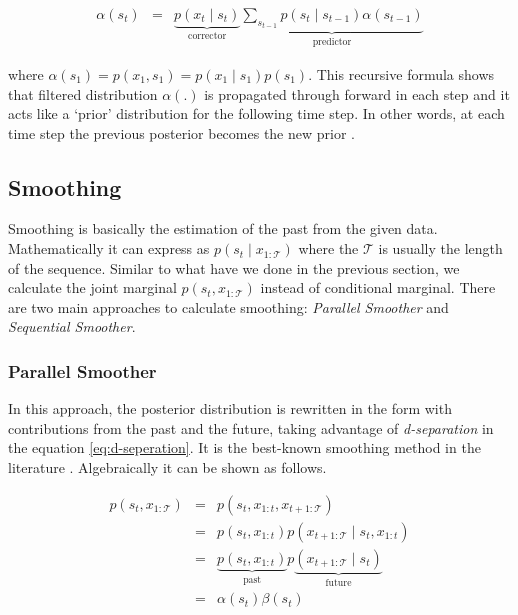 \begin{eqnarray}
    \alpha\left(s_{t}\right) & = & \underbrace{p\left(x_{t} \mid s_{t}\right)}_{\text { corrector }} \underbrace{\sum_{s_{t-1}} p\left(s_{t} \mid s_{t-1}\right) \alpha\left(s_{t-1}\right)}_{\text { predictor }} \label{eq:filtering2}
\end{eqnarray}

where $\alpha \left(s_1\right) = p\left(x_{1}, s_{1}\right) = p\left(x_{1} \mid s_{1}\right)p\left(s_{1}\right)$. This recursive formula shows that filtered distribution $\alpha(.)$ is propagated through forward in each step and it acts like a `prior' distribution for the following time step. In other words, at each time step the previous posterior becomes the new prior \cite{barber2012bayesian}.

\subsection{Smoothing}

Smoothing is basically the estimation of the past from the given data.
Mathematically it can express as $p(s_t\mid x_{1:\mathcal{T}})$ where the $\mathcal{T}$ is usually the length of the sequence.
Similar to what have we done in the previous section, we calculate the joint marginal $p(s_t,x_{1:\mathcal{T}})$ instead of conditional marginal.
There are two main approaches to calculate smoothing: {\it Parallel Smoother} and {\it Sequential Smoother}.

\subsubsection{Parallel Smoother}

In this approach, the posterior distribution is rewritten in the form with contributions from the past and the future, taking advantage of {\it d-separation} in the equation \ref{eq:d-seperation}. 
It is the best-known smoothing method in the literature \cite{rabiner1989tutorial}.
Algebraically it can be shown as follows.

\begin{eqnarray}
    p\left(s_{t}, x_{1 : \mathcal{T}}\right) & = & p\left(s_{t}, x_{1 : t}, x_{t+1 : \mathcal{T}}\right) \\
    & = & p\left(s_{t}, x_{1 : t}\right)p \left(x_{t+1 : \mathcal{T}} \mid s_{t}, x_{1 : t}\right) \\
    & = & \underbrace{p\left(s_{t}, x_{1 : t}\right)}_{\text { past }} p \underbrace{\left(x_{t+1 : \mathcal{T}} \mid s_{t}\right)}_{\text { future }} \label{eq:d-seperation}\\
    & = & \alpha\left(s_t\right)\beta\left(s_t\right)
\end{eqnarray}


